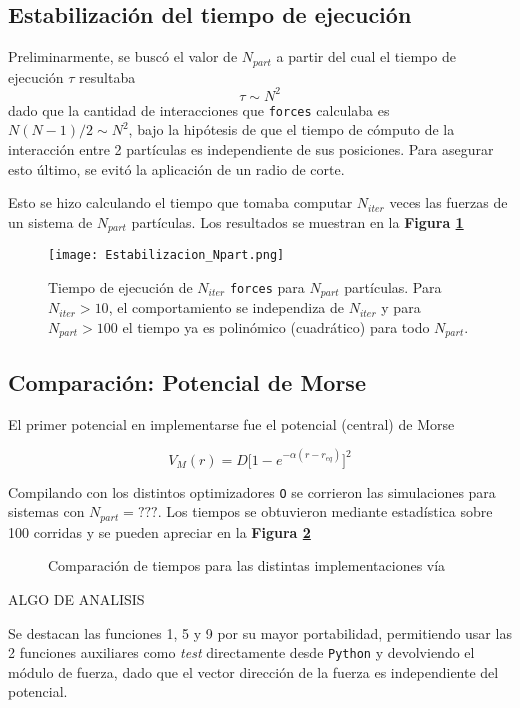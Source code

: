 \documentclass[twoside, 12pt]{article}
\begin{document}
\subsection{Estabilización del tiempo de ejecución}

Preliminarmente, se buscó el valor de $N_{part}$ a partir del cual el tiempo de ejecución $\tau$ resultaba \[\tau\sim N^2\] dado que la cantidad de interacciones que \texttt{forces} calculaba es $N(N-1)/2\sim N^2$, bajo la hipótesis de que el tiempo de cómputo de la interacción entre 2 partículas es independiente de sus posiciones. Para asegurar esto último, se evitó la aplicación de un radio de corte.

Esto se hizo calculando el tiempo que tomaba computar $N_{iter}$ veces las fuerzas de un sistema de $N_{part}$ partículas. Los resultados se muestran en la \textbf{Figura \ref{fig:TvsNpart}}

\begin{figure}[h]
	\centering
	\texttt{[image: Estabilizacion\_Npart.png]}
	\caption{Tiempo de ejecución de $N_{iter}$ \texttt{forces} para $N_{part}$ partículas. Para $N_{iter}>10$, el comportamiento se independiza de $N_{iter}$ y para $N_{part}>100$ el tiempo ya es polinómico (cuadrático) para todo $N_{part}$.}
	\label{fig:TvsNpart}
\end{figure}

\subsection{Comparación: Potencial de Morse}

El primer potencial en implementarse fue el potencial (central) de Morse

\[ V_{M} (r) = D\big[1-e^{-\alpha (r-r_{eq})}\big]^2\]

Compilando con los distintos optimizadores \texttt{O} se corrieron las simulaciones para sistemas con $N_{part}=???$. Los tiempos se obtuvieron mediante estadística sobre 100 corridas y se pueden apreciar en la \textbf{Figura \ref{fig:CompTodas}}

\begin{figure}[h]
	\centering
	\caption{Comparación de tiempos para las distintas implementaciones vía}
	\label{fig:CompTodas}
\end{figure}

ALGO DE ANALISIS

Se destacan las funciones 1, 5 y 9 por su mayor portabilidad, permitiendo usar las 2 funciones auxiliares como \textit{test} directamente desde \texttt{Python} y devolviendo el módulo de fuerza, dado que el vector dirección de la fuerza es independiente del potencial.
\end{document}
